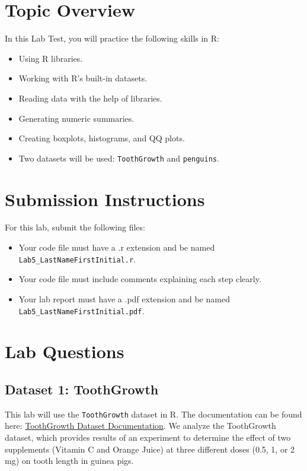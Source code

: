 \documentclass{article}
\begin{document}
\section*{Topic Overview}
In this Lab Test, you will practice the following skills in R:
\begin{itemize}
    \item Using R libraries.
    \item Working with R's built-in datasets.
    \item Reading data with the help of libraries.
    \item Generating numeric summaries.
    \item Creating boxplots, histograms, and QQ plots.
    \item Two datasets will be used: \texttt{ToothGrowth} and \texttt{penguins}.
\end{itemize}

\section{Submission Instructions}
For this lab, submit the following files:
\begin{itemize}
    \item Your code file must have a .r extension and be named \texttt{Lab5\_LastNameFirstInitial.r}.
    \item Your code file must include comments explaining each step clearly.
    \item Your lab report must have a .pdf extension and be named \texttt{Lab5\_LastNameFirstInitial.pdf}.
\end{itemize}

\section{Lab Questions}

\subsection{Dataset 1: ToothGrowth}
This lab will use the \texttt{ToothGrowth} dataset in R. The documentation can be found here:
\href{https://stat.ethz.ch/R-manual/R-patched/library/datasets/html/ToothGrowth.html}{ToothGrowth Dataset Documentation}.
We analyze the ToothGrowth dataset, which provides results of an experiment to determine the effect of two supplements (Vitamin C and Orange Juice) at three different doses (0.5, 1, or 2 mg) on tooth length in guinea pigs.\\
\end{document}
